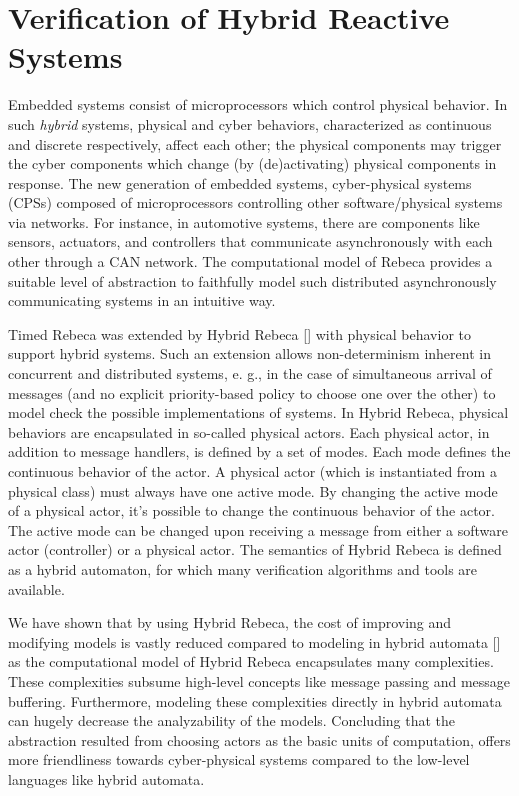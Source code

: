 \section{Verification of Hybrid Reactive Systems}\label{sec::HRebeca}
Embedded systems consist of microprocessors which control physical behavior. In such \emph{hybrid} systems, physical and cyber behaviors, characterized as continuous and discrete respectively, affect each other; the physical components may trigger the cyber components which change (by (de)activating) physical components in response. The new generation of embedded systems, cyber-physical systems (CPSs) composed of microprocessors controlling other software/physical systems via networks. For instance, in automotive systems, there are components like sensors, actuators, and controllers that communicate asynchronously with each other through a CAN network. The computational model of Rebeca provides a suitable level of abstraction to faithfully model such distributed asynchronously communicating systems in an intuitive way.

Timed Rebeca was extended by Hybrid Rebeca [] with physical behavior to support hybrid systems. Such an extension allows non-determinism inherent in concurrent and distributed systems, e. g., in the case of simultaneous arrival of messages (and no explicit priority-based policy to choose one over the other) to model check the possible implementations of systems. In Hybrid Rebeca, physical behaviors are encapsulated in so-called physical actors. Each physical actor, in addition to message handlers, is defined by a set of modes. Each mode defines the continuous behavior of the actor. A physical actor (which is instantiated from a physical class) must always have one active mode. By changing the active mode of a physical actor, it's possible to change the continuous behavior of the actor. The active mode can be changed upon receiving a message from either a software actor (controller) or a physical actor. The semantics of Hybrid Rebeca is defined as a hybrid automaton, for which many verification algorithms and tools are available. 

We have shown that by using Hybrid Rebeca, the cost of improving and modifying models is vastly reduced compared to modeling in hybrid automata [] as the computational model of Hybrid Rebeca encapsulates many complexities. These complexities subsume high-level concepts like message passing and message buffering. Furthermore, modeling these complexities directly in hybrid automata can hugely decrease the analyzability of the models. Concluding that the abstraction resulted from choosing actors as the basic units of computation, offers more friendliness towards cyber-physical systems compared to the low-level languages like hybrid automata.